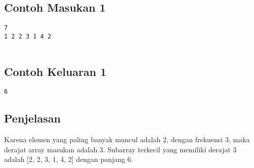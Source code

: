\documentclass{article}
\begin{document}
\linebreak
\begin{multicols}{2}
\subsection*{Contoh Masukan 1}
\begin{lstlisting}
7
1 2 2 3 1 4 2


\end{lstlisting}
\null
\columnbreak
\subsection*{Contoh Keluaran 1}
\begin{lstlisting}
6
\end{lstlisting}
\vfill
\null
\end{multicols}

\subsection*{Penjelasan}
Karena elemen yang paling banyak muncul adalah 2, dengan frekuensi 3, maka derajat array masukan adalah 3.
Subarray terkecil yang memiliki derajat 3 adalah [2, 2, 3, 1, 4, 2] dengan panjang 6.
\end{document}

